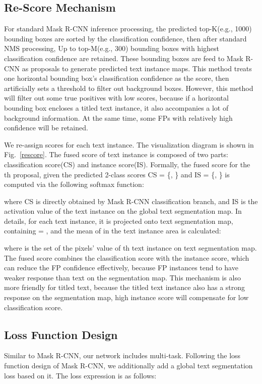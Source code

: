 \documentclass[letterpaper]{article} \usepackage{aaai19}  \usepackage{times}  \usepackage{helvet}  \usepackage{courier}  \usepackage{url}  \usepackage{graphicx}
\begin{document}
 \subsection{Re-Score Mechanism}
For standard Mask R-CNN inference processing, the predicted top-K(e.g., 1000) bounding boxes are sorted by the classification confidence, then after standard NMS processing, Up to top-M(e.g.,  300) bounding boxes with highest classification confidence are retained. These bounding boxes are feed to Mask R-CNN as proposals to generate predicted text instance maps. 
This method treats one horizontal bounding box's classification confidence as the score, then artificially sets a threshold to filter out background boxes.
However, this method will filter out some true positives with low scores, because if a horizontal bounding box encloses a titled text instance, it also accompanies a lot of background information. 
At the same time, some FPs with relatively high confidence will be retained.

We re-assign scores for each text instance. The visualization diagram is shown in Fig.~\ref{rescore}. The fused score of text instance is composed of two parts: classification score(CS) and instance score(IS).
Formally, the fused score for the th proposal, given the predicted 2-class scores CS = \{, \} and IS = \{, \} is computed via the following softmax function:

where CS is directly obtained by Mask R-CNN classification branch, and IS is the activation value of the text instance on the global text segmentation map.
In details, for each text instance, it is projected onto text segmentation map, containing  = , and the mean of  in the text instance area is calculated:

where  is the set of the pixels' value of th text instance on text segmentation map.
The fused score combines the classification score with the instance score,
which can reduce the FP confidence effectively, because FP instances tend to have weaker response than text on the segmentation map.
This mechanism is also more friendly for titled text, because the titled text instance also has a strong response on the segmentation map, high instance score will compensate for low classification score.


 \subsection{Loss Function Design}
 Similar to Mask R-CNN, our network includes multi-task. 
 Following the loss function design of Mask R-CNN, we additionally add a global text segmentation loss based on it.
 The loss expression is as follows:
 
\end{document}
